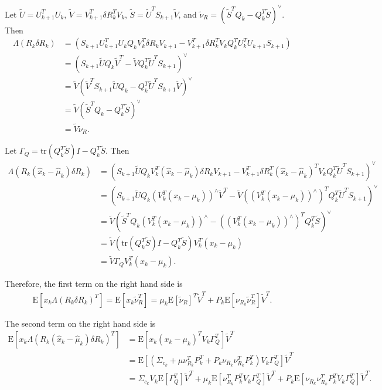 \documentclass[10pt]{article}
\newcommand{\tr}[1]{\ensuremath{\mathrm{tr}\left( #1 \right)}}
\newcommand{\expect}[1]{\ensuremath{\mathrm{E}\left[ #1 \right]}}
\begin{document}
\noindent Let $\tilde{U} = U_{k+1}^TU_k$, $\tilde{V} = V_{k+1}^T\delta R_k^TV_k$, $\tilde{S} = \tilde{U}^TS_{k+1}\tilde{V}$, and $\tilde{\nu}_R = (\tilde{S}^TQ_k - Q_k^T\tilde{S})^\vee$.
Then
\begin{align*}
	\Lambda(R_k\delta R_k) &= (S_{k+1}U_{k+1}^TU_kQ_kV_k^T\delta R_kV_{k+1} - V_{k+1}^T\delta R_k^TV_kQ_k^TU_k^TU_{k+1}S_{k+1}) \\
	&= (S_{k+1}\tilde{U}Q_k\tilde{V}^T - \tilde{V}Q_k^T\tilde{U}^TS_{k+1})^\vee \\
	&= \tilde{V} (\tilde{V}^TS_{k+1}\tilde{U}Q_k - Q_k^T\tilde{U}^TS_{k+1}\tilde{V})^\vee \\
	&= \tilde{V}(\tilde{S}^TQ_k - Q_k^T\tilde{S})^\vee \\
	&= \tilde{V}\tilde{\nu}_R.
\end{align*}

\noindent Let $\Gamma_Q = \tr{Q_k^T\tilde{S}}I-Q_k^T\tilde{S}$.
Then
\begin{align*}
	\Lambda(R_k(\hat{x}_k-\hat{\mu}_k)\delta R_k) &= (S_{k+1}\tilde{U}Q_kV_k^T(\hat{x}_k-\hat{\mu}_k)\delta R_kV_{k+1} - V_{k+1}^T\delta R_k^T(\hat{x}_k-\hat{\mu}_k)^TV_kQ_k^T\tilde{U}^TS_{k+1})^\vee \\
	&= \left( S_{k+1}\tilde{U}Q_k(V_k^T(x_k-\mu_k))^\wedge\tilde{V}^T - \tilde{V}((V_k^T(x_k-\mu_k))^\wedge)^TQ_k^T\tilde{U}^TS_{k+1} \right)^\vee \\
	&= \tilde{V}\left( \tilde{S}^TQ_k(V_k^T(x_k-\mu_k))^\wedge - ((V_k^T(x_k-\mu_k))^\wedge)^TQ_k^T\tilde{S} \right)^\vee \\
	&= \tilde{V}\left( \tr{Q_k^T\tilde{S}}I - Q_k^T\tilde{S} \right)V_k^T(x_k-\mu_k) \\
	&= \tilde{V}\Gamma_QV_k^T(x_k-\mu_k).
\end{align*}

\noindent Therefore, the first term on the right hand side is
\begin{align*}
	\expect{x_k\Lambda(R_k\delta R_k)^T} = \expect{x_k\tilde{\nu}_R^T} = \mu_k\expect{\tilde{\nu}_R}^T\tilde{V}^T + P_k\expect{\nu_{R_k}\tilde{\nu}_R^T}\tilde{V}^T.
\end{align*}

\noindent The second term on the right hand side is
\begin{align*}
	\expect{x_k\Lambda(R_k(\hat{x}_k-\hat{\mu}_k)\delta R_k)^T} &= \expect{x_k(x_k-\mu_k)^TV_k\Gamma_Q^T}\tilde{V}^T \\
	&= \expect{(\Sigma_{c_k} + \mu\nu_{R_k}^TP_k^T + P_k\nu_{R_k}\nu_{R_k}^TP_k^T)V_k\Gamma_Q^T}\tilde{V}^T \\
	&= \Sigma_{c_k}V_k\expect{\Gamma_Q^T}\tilde{V}^T + \mu_k\expect{\nu_{R_k}^TP_k^TV_k\Gamma_Q^T}\tilde{V}^T + P_k\expect{\nu_{R_k}\nu_{R_k}^TP_k^TV_k\Gamma_Q^T}\tilde{V}^T.
\end{align*}
\end{document}
